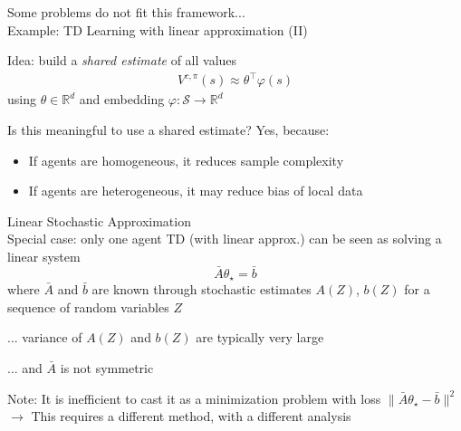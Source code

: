 \documentclass[aspectratio=169,14pt]{beamer}
\begin{document}
\begin{frame}{Some problems do not fit this framework...\\[-0.5em]
    \large Example: TD Learning with linear approximation (II)}

  Idea: build a \emph{shared estimate} of all values
  \begin{align*}
    V^{c,\pi}(s) \approx \theta^\top \varphi(s)
  \end{align*}
  using $\theta \in \mathbb{R}^d$ and embedding $\varphi: \mathcal{S} \rightarrow \mathbb{R}^d$

  \vspace{1em}
  
  \pause

  Is this meaningful to use a shared estimate? Yes, because:
  \begin{itemize}
  \item If agents are homogeneous, it reduces sample complexity
  \item If agents are heterogeneous, it may reduce bias of local data
  \end{itemize}
\end{frame}


\begin{frame}{Linear Stochastic Approximation\\[-0.5em]
  \normalsize Special case: only one agent}
  TD (with linear approx.) can be seen as solving a linear system 
  \begin{equation*}
    \bar{A} \theta_\star
    = 
    \bar{b}
  \end{equation*}
  where $\bar{A}$ and $\bar{b}$ are known through stochastic estimates $A(Z)$, $b(Z)$
  for a sequence of random variables $Z$

  \vspace{-0.5em}

  ... variance of $A(Z)$ and $b(Z)$ are typically very large

  \vspace{-0.5em}
  
  ... and $\bar{A}$ is not symmetric
  
  \vspace{0.5em}

  \pause

  \small 
  Note: It is inefficient to cast it as a minimization problem with loss $\| \bar{A} \theta_\star - \bar{b} \|^2$ \\
  $\rightarrow$ This requires a different method, with a different analysis
\end{frame}
\end{document}

